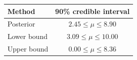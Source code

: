 
\begin{center}
\begin{tabular}{l|c}
\hline
Method & 90\% credible interval \\
\hline
Posterior & $2.45 \leq \mu \leq 8.90$ \\
Lower bound & $3.09 \leq \mu \leq 10.00$ \\
Upper bound & $0.00 \leq \mu \leq 8.36$ \\
\hline
\end{tabular}
\end{center}

